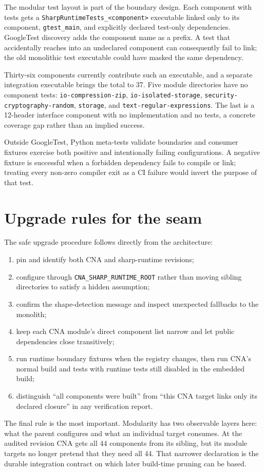 The modular test layout is part of the boundary design. Each component with tests gets a
\texttt{SharpRuntimeTests\_<component>} executable linked only to its component,
\texttt{gtest\_main}, and explicitly declared test-only dependencies. GoogleTest discovery
adds the component name as a prefix. A test that accidentally reaches into an undeclared
component can consequently fail to link; the old monolithic test executable could have
masked the same dependency.

Thirty-six components currently contribute such an executable, and a separate integration
executable brings the total to 37. Five module directories have no component tests:
\texttt{io-compression-zip}, \texttt{io-isolated-storage},
\texttt{security-cryptography-random}, \texttt{storage}, and
\texttt{text-regular-expressions}. The last is a 12-header interface component with no
implementation and no tests, a concrete coverage gap rather than an implied success.

Outside GoogleTest, Python meta-tests validate boundaries and consumer fixtures exercise both
positive and intentionally failing configurations. A negative fixture is successful when a
forbidden dependency fails to compile or link; treating every non-zero compiler exit as a CI
failure would invert the purpose of that test.

\section{Upgrade rules for the seam}

The safe upgrade procedure follows directly from the architecture:

\begin{enumerate}
  \item pin and identify both CNA and sharp-runtime revisions;
  \item configure through \texttt{CNA\_SHARP\_RUNTIME\_ROOT} rather than moving sibling
        directories to satisfy a hidden assumption;
  \item confirm the shape-detection message and inspect unexpected fallbacks to the monolith;
  \item keep each CNA module's direct component list narrow and let public dependencies close
        transitively;
  \item run runtime boundary fixtures when the registry changes, then run CNA's normal build
        and tests with runtime tests still disabled in the embedded build;
  \item distinguish ``all components were built'' from ``this CNA target links only its
        declared closure'' in any verification report.
\end{enumerate}

The final rule is the most important. Modularity has two observable layers here: what the
parent configures and what an individual target consumes. At the audited revision CNA gets
all 44 components from its sibling, but its module targets no longer pretend that they need
all 44. That narrower declaration is the durable integration contract on which later
build-time pruning can be based.
